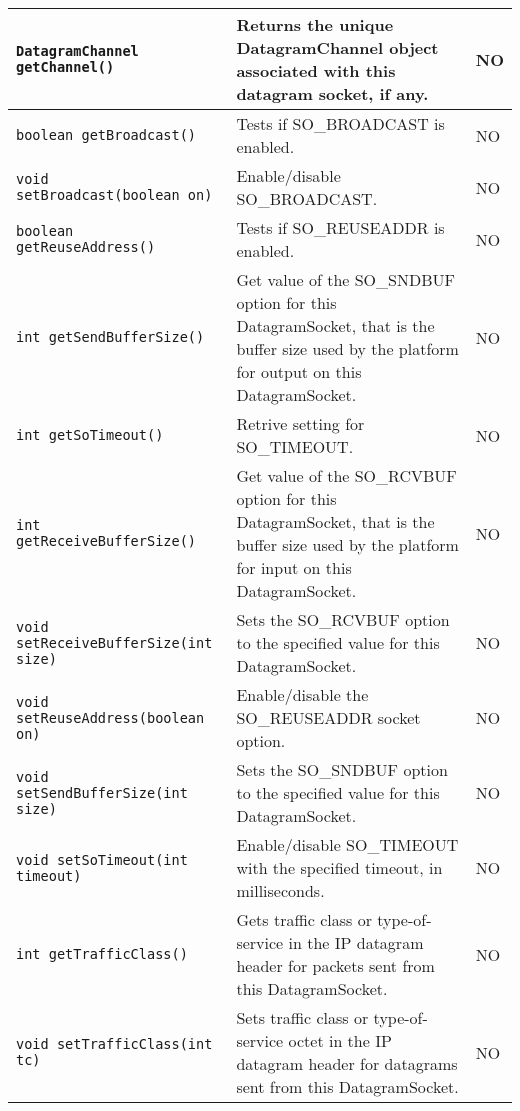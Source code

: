 {\begin{longtable}{ | p{7cm} | p{5.6cm} | p{1.2cm} | }
\hline
\footnotesize{\texttt{DatagramChannel getChannel()}} &
          Returns the unique DatagramChannel object associated with
          this datagram socket, if any. &
          NO \\
\hline
\footnotesize{\texttt{boolean getBroadcast()}} &
          Tests if SO\_BROADCAST is enabled. &
          NO \\
\hline
\footnotesize{\texttt{void setBroadcast(boolean on)}} &
          Enable/disable SO\_BROADCAST. &
          NO \\
\hline
\footnotesize{\texttt{boolean getReuseAddress()}} &
          Tests if SO\_REUSEADDR is enabled. &
          NO \\
\hline
\footnotesize{\texttt{int getSendBufferSize()}} &
          Get value of the SO\_SNDBUF option for this DatagramSocket,
          that is the buffer size used by the platform for output on
          this DatagramSocket. &
          NO \\
\hline
\footnotesize{\texttt{int getSoTimeout()}} &
          Retrive setting for SO\_TIMEOUT. &
          NO \\
\hline
\footnotesize{\texttt{int getReceiveBufferSize()}} &
          Get value of the SO\_RCVBUF option for this DatagramSocket,
          that is the buffer size used by the platform for input on
          this DatagramSocket. &
          NO \\
\hline
\footnotesize{\texttt{void setReceiveBufferSize(int size)}} &
          Sets the SO\_RCVBUF option to the specified value for this
          DatagramSocket. &
          NO \\
\hline
\footnotesize{\texttt{void setReuseAddress(boolean on)}} &
          Enable/disable the SO\_REUSEADDR socket option. &
          NO \\
\hline
\footnotesize{\texttt{void setSendBufferSize(int size)}} &
          Sets the SO\_SNDBUF option to the specified value for this
          DatagramSocket. &
          NO \\
\hline
\footnotesize{\texttt{void setSoTimeout(int timeout)}} &
          Enable/disable SO\_TIMEOUT with the specified timeout, in
          milliseconds. &
          NO \\
\hline
\footnotesize{\texttt{int getTrafficClass()}} &
          Gets traffic class or type-of-service in the IP datagram
          header for packets sent from this DatagramSocket. &
          NO \\
\hline
\footnotesize{\texttt{void setTrafficClass(int tc)}} &
          Sets traffic class or type-of-service octet in the IP
          datagram header for datagrams sent from this
          DatagramSocket. & NO \\
\hline 

\end{longtable}

\normalsize

\label{usr:method-table}

}
